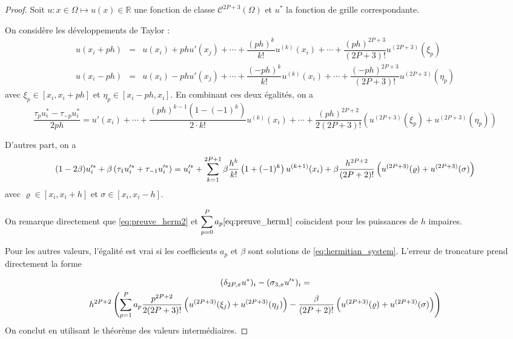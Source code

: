 \begin{proof}
Soit $u : x \in \Omega \mapsto u(x) \in \mathbb{R}$ une fonction de classe $\mathcal{C}^{2P+3}( \Omega)$ et $u^*$ la fonction de grille correspondante.

On considère les développements de Taylor :
\begin{equation}
\begin{array}{rcl}
u(x_i + ph) & = & u(x_i) + p h u'(x_j) + \cdots + \dfrac{(ph)^k}{k!}u^{(k)}(x_i) + \cdots +\dfrac{(ph)^{2P+3}}{(2P+3)!} u^{(2P+3)}(\xi_p)\\
u(x_i - ph) & = & u(x_i) - p h u'(x_j) + \cdots + \dfrac{(-ph)^k}{k!}u^{(k)}(x_i) + \cdots +\dfrac{(-ph)^{2P+3}}{(2P+3)!} u^{(2P+3)}(\eta_p)
\end{array}
\end{equation}
avec $\xi_p \in [x_i, x_i+ph]$ et $\eta_p \in [x_i-ph, x_i]$. En combinant ces deux égalités, on a
\begin{equation}
\dfrac{\tau_pu^*_i - \tau_{-p} u^*_i}{2ph} = u'(x_i) + \cdots + \dfrac{(ph)^{k-1}(1 - (-1)^k)}{2 \cdot k!} u^{(k)}(x_i) + \cdots +\dfrac{(ph)^{2P+2}}{2(2P+3)!} \left( u^{(2P+3)}(\xi_p) + u^{(2P+3)}(\eta_p) \right)
\label{eq:preuve_herm1}
\end{equation}

D'autres part, on a 
\begin{equation}
(1-2\beta) u'^*_i + \beta \left( \tau_1 u'^*_{i} + \tau_{-1} u'^*_{i} \right) = u'^*_i +  \displaystyle\sum\limits_{k=1}^{2P+1} \beta \dfrac{h^{k}}{k!} \left( 1 + (-1)^k \right) u^{(k+1)}(x_i)+ \beta \dfrac{h^{2P+2}}{(2P+2)!} \left(u^{(2P+3)}(\varrho) + u^{(2P+3)}(\sigma) \right) 
\label{eq:preuve_herm2}
\end{equation}
avec $\varrho \in [x_i, x_i + h]$ et $\sigma \in [x_i, x_i - h]$. 

On remarque directement que \eqref{eq:preuve_herm2} et $\displaystyle\sum\limits_{p=0}^P a_p  \eqref{eq:preuve_herm1}$ coïncident pour les puissances de $h$ impaires. 

Pour les autres valeurs, l'égalité est vrai si les coefficients $a_p$ et $\beta$ sont solutions de \eqref{eq:hermitian_system}. L'erreur de troncature prend directement la forme 

\begin{multline}
(\delta_{2P,x} u^*)_i - (\sigma_{3,x} u'^*)_i = \\
h^{2P+2} \left( \displaystyle\sum\limits_{p=1}^P a_p  \dfrac{p^{2P+2}}{2(2P+3)!} \left( u^{(2P+3)}(\xi_j) + u^{(2P+3)}(\eta_j) \right) - \dfrac{\beta}{(2P+2)!} \left(u^{(2P+3)}(\varrho) + u^{(2P+3)}(\sigma) \right) \right)
\end{multline}
On conclut en utilisant le théorème des valeurs intermédiaires.
\end{proof}

